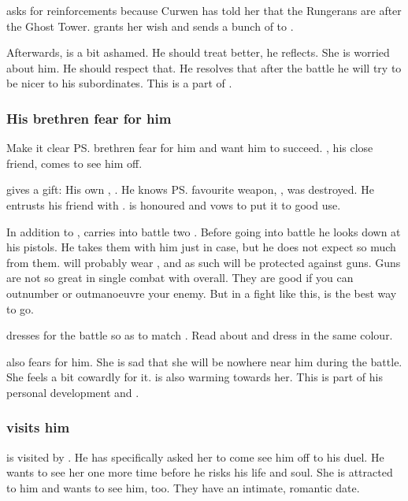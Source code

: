 \Achsah asks for reinforcements because Curwen has told her that the Rungerans are after the Ghost Tower.
\Teshrial grants her wish and sends a bunch of \resphain to \Forclin. 

Afterwards, \Teshrial is a bit ashamed. 
He should treat \Achsah better, he reflects. 
She is worried about him.
He should respect that.
He resolves that after the battle he will try to be nicer to his \bezed subordinates.
This is a part of . 




\subsubsection{His brethren fear for him}
Make it clear \ps{\Teshrial} brethren fear for him and want him to succeed. 
\Menessiaraid, his close friend, comes to see him off. 

\Menessiaraid{} gives \Teshrial{} a gift: 
His own \senaan, . 
He knows \ps{\Teshrial} favourite weapon, , was destroyed. 
He entrusts his friend with \Ossiraith. 
\Teshrial{} is honoured and vows to put it to good use. 

In addition to \Ossiraith, \Teshrial{} carries into battle two . 
Before going into battle he looks down at his pistols. 
He takes them with him just in case, but he does not expect so much from them. 
\Ishnaruchaefir{} will probably wear , and as such will be protected against guns. 
Guns are not so great in single combat with \dragons{} overall.
They are good if you can outnumber or outmanoeuvre your enemy. 
But in a fight like this, \melee{} is the best way to go. 

\Teshrial dresses for the battle so as to match \Ossiraith. 
Read about  and dress \Teshrial in the same colour. 

\Urizeth also fears for him.
She is sad that she will be nowhere near him during the battle.
She feels a bit cowardly for it.
\Teshrial is also warming towards her.
This is part of his personal development and . 





\subsubsection{\Firaxel visits him}
\Teshrial{} is visited by \Firaxel. 
He has specifically asked her to come see him off to his duel. 
He wants to see her one more time before he risks his life and soul. 
She is attracted to him and wants to see him, too. 
They have an intimate, romantic date. 


